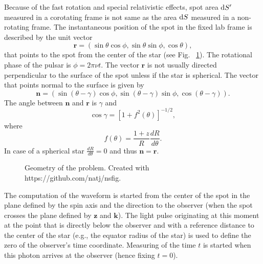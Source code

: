 \documentclass{wihuri}
\def\be{\begin{equation}}
\def\ee{\end{equation}}
\def\d{{\rm d}}
\newcommand{\bmath}[1]{\boldsymbol{#1}}
\begin{document}
Because of the fast rotation and special relativistic effects, spot area $\d S^\prime$ measured in a corotating frame is not same as the area $\d S$ measured in a non-rotating frame. The instantaneous position of the spot in the fixed lab frame is described by the unit vector 
\begin{equation}
\bmath{r}=(\sin\theta\cos\phi, \sin\theta\sin\phi, \cos\theta),
\end{equation}
that points to the spot from the center of the star (see Fig. ~\ref{fig:geom2}). The rotational phase of the pulsar is $\phi=2\pi\nu t$. The vector $\bmath{r}$ is not usually directed perpendicular to the surface of the spot unless if the star is spherical. The vector that points normal to the surface is given by
\begin{equation}
\bmath{n}=(\sin(\theta-\gamma)\cos\phi, \sin(\theta-\gamma)\sin\phi, \cos(\theta-\gamma)).
\end{equation}
The angle between $\bmath{n}$ and $\bmath{r}$ is $\gamma$ and 
\begin{equation}
\cos\gamma=[1+f^{2}(\theta)]^{-1/2},
\end{equation}
where
\be \label{eq:ftheta}
f(\theta)=\frac{1+z}{R}\frac{dR}{d\theta}.
\ee
In case of a spherical star $\frac{dR}{d\theta} = 0$ and thus $\bmath{n} = \bmath{r}$.

\begin{figure}
\centerline{}
\caption{Geometry of the problem. Created with https://github.com/natj/nsfig. %
\label{fig:geom2}}
\end{figure}



The computation of the waveform is started from the center of the spot in the plane defined by the spin axis and the direction to the observer 
(when the spot crosses the plane defined by $\bmath{z}$ and $\bmath{k}$). The light pulse originating at this moment at the point that is directly below the observer and with a reference distance to the center of the star (e.g., the equator radius of the star) is used to define the zero of the observer's time coordinate. Measuring of the time $t$ is started when this photon arrives at the observer (hence fixing $t=0$). %
\end{document}
